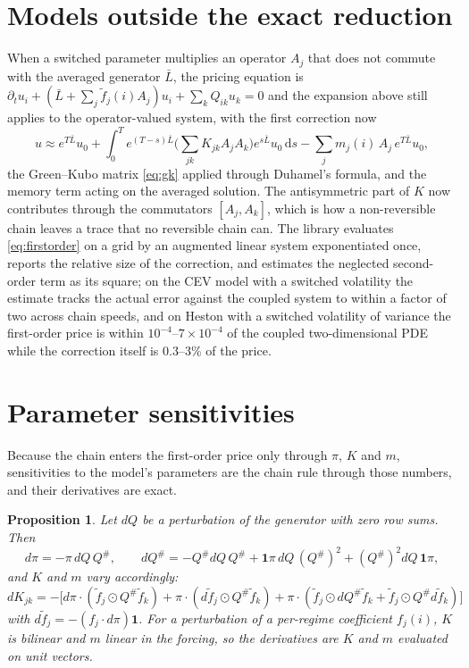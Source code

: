 \documentclass[11pt]{article}
\newtheorem{proposition}[theorem]{Proposition}
\theoremstyle{remark}
\newcommand{\dd}{\,\mathrm{d}}
\begin{document}
\section{Models outside the exact reduction}
\label{sec:firstorder}

When a switched parameter multiplies an operator $A_j$ that does not commute with the averaged generator
$\bar L$, the pricing equation is $\partial_t u_i + (\bar L + \sum_j \tilde f_j(i) A_j)u_i + \sum_k Q_{ik}u_k = 0$ and
the expansion above still applies to the operator-valued system, with the first
correction now
\begin{equation}
  u \approx e^{T\bar L}u_0 + \int_0^T e^{(T-s)\bar L}\Big(\sum_{jk} K_{jk}A_jA_k\Big)e^{s\bar L}u_0\dd s - \sum_j m_j(i)\,A_j\,e^{T\bar L}u_0,
  \label{eq:firstorder}
\end{equation}
the Green--Kubo matrix \eqref{eq:gk} applied through Duhamel's formula, and the memory term acting on the averaged
solution. The antisymmetric part of $K$ now contributes through the commutators $[A_j, A_k]$, which is how a
non-reversible chain leaves a trace that no reversible chain can. The library evaluates \eqref{eq:firstorder} on
a grid by an augmented linear system exponentiated once, reports the relative size of the correction, and
estimates the neglected second-order term as its square; on the CEV model with a switched volatility the
estimate tracks the actual error against the coupled system to within a factor of two across chain speeds, and
on Heston with a switched volatility of variance the first-order price is within $10^{-4}$--$7\times10^{-4}$ of the
coupled two-dimensional PDE while the correction itself is 0.3--3\% of the price.

\section{Parameter sensitivities}
\label{sec:greeks}

Because the chain enters the first-order price only through $\pi$, $K$ and $m$, sensitivities to the model's
parameters are the chain rule through those numbers, and their derivatives are exact.

\begin{proposition}
Let $dQ$ be a perturbation of the generator with zero row sums. Then
\[
  d\pi = -\pi\, dQ\, Q^{\#}, \qquad
  dQ^{\#} = -Q^{\#}dQ\,Q^{\#} + \mathbf 1\pi\, dQ\,(Q^{\#})^2 + (Q^{\#})^2 dQ\,\mathbf 1\pi,
\]
and $K$ and $m$ vary accordingly: $dK_{jk} = -\big[d\pi\cdot(\tilde f_j\odot Q^{\#}\tilde f_k) + \pi\cdot(d\tilde f_j\odot Q^{\#}\tilde f_k) + \pi\cdot(\tilde f_j\odot dQ^{\#}\tilde f_k + \tilde f_j\odot Q^{\#}d\tilde f_k)\big]$ with $d\tilde f_j = -(f_j\cdot d\pi)\mathbf 1$.
For a perturbation of a per-regime coefficient $f_j(i)$, $K$ is bilinear and $m$ linear in the forcing, so the
derivatives are $K$ and $m$ evaluated on unit vectors.
\end{proposition}
\end{document}

